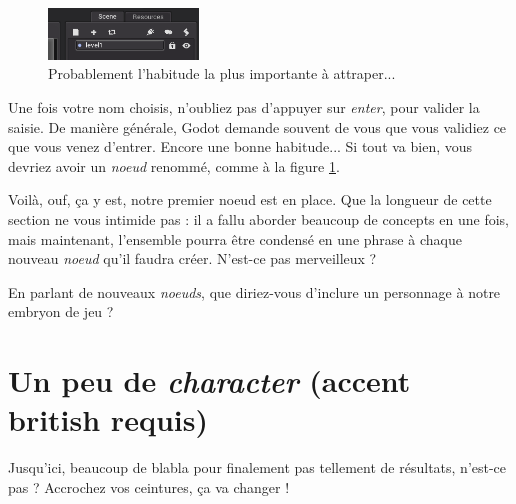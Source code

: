 \begin{figure}
  \begin{center}
    \includegraphics[width=4cm]{img/lvl1-rename.png}
  \end{center}
  \caption{\label{lvl1-rename} Probablement l'habitude la plus importante à attraper...}
\end{figure}

Une fois votre nom choisis, n'oubliez pas d'appuyer sur \emph{enter}, pour valider la saisie. De manière générale, Godot demande souvent de vous que vous validiez ce que vous venez d'entrer. Encore une bonne habitude... Si tout va bien, vous devriez avoir un \emph{noeud} renommé, comme à la figure \ref{lvl1-rename}.

Voilà, ouf, ça y est, notre premier noeud est en place. Que la longueur de cette section ne vous intimide pas : il a fallu aborder beaucoup de concepts en une fois, mais maintenant, l'ensemble pourra être condensé en une phrase à chaque nouveau \emph{noeud} qu'il faudra créer. N'est-ce pas merveilleux ?

En parlant de nouveaux \emph{noeuds}, que diriez-vous d'inclure un personnage à notre embryon de jeu ?

\section{Un peu de \emph{character} (accent british requis)}

Jusqu'ici, beaucoup de blabla pour finalement pas tellement de résultats, n'est-ce pas ? Accrochez vos ceintures, ça va changer !